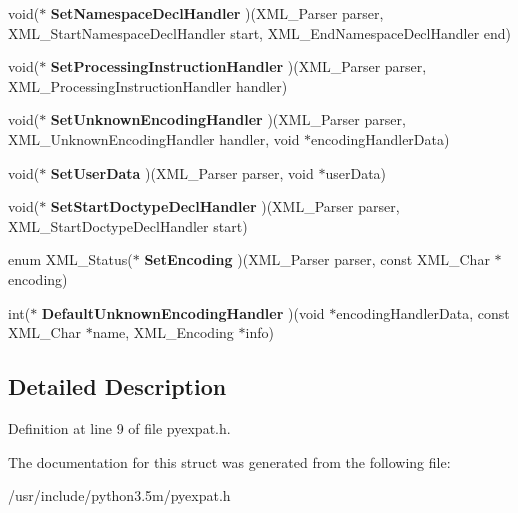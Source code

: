 \begin{DoxyCompactItemize}
\item 
void($\ast$ {\bfseries Set\+Namespace\+Decl\+Handler} )(X\+M\+L\+\_\+\+Parser parser, X\+M\+L\+\_\+\+Start\+Namespace\+Decl\+Handler start, X\+M\+L\+\_\+\+End\+Namespace\+Decl\+Handler end)\hypertarget{structPyExpat__CAPI_ad9e94c45149136ca717b975acc06a127}{}\label{structPyExpat__CAPI_ad9e94c45149136ca717b975acc06a127}

\item 
void($\ast$ {\bfseries Set\+Processing\+Instruction\+Handler} )(X\+M\+L\+\_\+\+Parser parser, X\+M\+L\+\_\+\+Processing\+Instruction\+Handler handler)\hypertarget{structPyExpat__CAPI_a215cc650811061dac3193bcb2c3473db}{}\label{structPyExpat__CAPI_a215cc650811061dac3193bcb2c3473db}

\item 
void($\ast$ {\bfseries Set\+Unknown\+Encoding\+Handler} )(X\+M\+L\+\_\+\+Parser parser, X\+M\+L\+\_\+\+Unknown\+Encoding\+Handler handler, void $\ast$encoding\+Handler\+Data)\hypertarget{structPyExpat__CAPI_a0e096e97c2371eb148a6af3916cbba8d}{}\label{structPyExpat__CAPI_a0e096e97c2371eb148a6af3916cbba8d}

\item 
void($\ast$ {\bfseries Set\+User\+Data} )(X\+M\+L\+\_\+\+Parser parser, void $\ast$user\+Data)\hypertarget{structPyExpat__CAPI_a43b5bc9b3ec3772d9edb2295e9a54489}{}\label{structPyExpat__CAPI_a43b5bc9b3ec3772d9edb2295e9a54489}

\item 
void($\ast$ {\bfseries Set\+Start\+Doctype\+Decl\+Handler} )(X\+M\+L\+\_\+\+Parser parser, X\+M\+L\+\_\+\+Start\+Doctype\+Decl\+Handler start)\hypertarget{structPyExpat__CAPI_aa1fd5da5c573434a703d998b4bbc6c0b}{}\label{structPyExpat__CAPI_aa1fd5da5c573434a703d998b4bbc6c0b}

\item 
enum X\+M\+L\+\_\+\+Status($\ast$ {\bfseries Set\+Encoding} )(X\+M\+L\+\_\+\+Parser parser, const X\+M\+L\+\_\+\+Char $\ast$encoding)\hypertarget{structPyExpat__CAPI_a4677b403da37d1ea5de125d3a6914499}{}\label{structPyExpat__CAPI_a4677b403da37d1ea5de125d3a6914499}

\item 
int($\ast$ {\bfseries Default\+Unknown\+Encoding\+Handler} )(void $\ast$encoding\+Handler\+Data, const X\+M\+L\+\_\+\+Char $\ast$name, X\+M\+L\+\_\+\+Encoding $\ast$info)\hypertarget{structPyExpat__CAPI_a92f8f99243fbb7d252efc954b30e123e}{}\label{structPyExpat__CAPI_a92f8f99243fbb7d252efc954b30e123e}

\end{DoxyCompactItemize}


\subsection{Detailed Description}


Definition at line 9 of file pyexpat.\+h.



The documentation for this struct was generated from the following file\+:\begin{DoxyCompactItemize}
\item 
/usr/include/python3.\+5m/pyexpat.\+h\end{DoxyCompactItemize}
